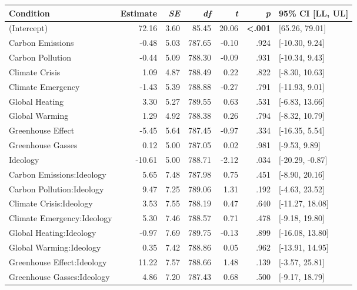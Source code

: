 \begin{table}[ht]
\centering
\begin{tabular}{lrrrrrl}
  \hline
Condition & Estimate & \textit{SE} & \textit{df} & \textit{t} & \textit{p} & 95\% CI [LL, UL] \\ 
  \hline
(Intercept) & 72.16 & 3.60 & 85.45 & 20.06 & \textbf{\textless  .001} & [65.26, 79.01] \\ 
  Carbon Emissions & -0.48 & 5.03 & 787.65 & -0.10 & .924 & [-10.30, 9.24] \\ 
  Carbon Pollution & -0.44 & 5.09 & 788.30 & -0.09 & .931 & [-10.34, 9.43] \\ 
  Climate Crisis & 1.09 & 4.87 & 788.49 & 0.22 & .822 & [-8.30, 10.63] \\ 
  Climate Emergency & -1.43 & 5.39 & 788.88 & -0.27 & .791 & [-11.93, 9.01] \\ 
  Global Heating & 3.30 & 5.27 & 789.55 & 0.63 & .531 & [-6.83, 13.66] \\ 
  Global Warming & 1.29 & 4.92 & 788.38 & 0.26 & .794 & [-8.32, 10.79] \\ 
  Greenhouse Effect & -5.45 & 5.64 & 787.45 & -0.97 & .334 & [-16.35, 5.54] \\ 
  Greenhouse Gasses & 0.12 & 5.00 & 787.05 & 0.02 & .981 & [-9.53, 9.89] \\ 
  Ideology & -10.61 & 5.00 & 788.71 & -2.12 & .034 & [-20.29, -0.87] \\ 
  Carbon Emissions:Ideology & 5.65 & 7.48 & 787.98 & 0.75 & .451 & [-8.90, 20.16] \\ 
  Carbon Pollution:Ideology & 9.47 & 7.25 & 789.06 & 1.31 & .192 & [-4.63, 23.52] \\ 
  Climate Crisis:Ideology & 3.53 & 7.55 & 788.19 & 0.47 & .640 & [-11.27, 18.08] \\ 
  Climate Emergency:Ideology & 5.30 & 7.46 & 788.57 & 0.71 & .478 & [-9.18, 19.80] \\ 
  Global Heating:Ideology & -0.97 & 7.69 & 789.75 & -0.13 & .899 & [-16.08, 13.80] \\ 
  Global Warming:Ideology & 0.35 & 7.42 & 788.86 & 0.05 & .962 & [-13.91, 14.95] \\ 
  Greenhouse Effect:Ideology & 11.22 & 7.57 & 788.66 & 1.48 & .139 & [-3.57, 25.81] \\ 
  Greenhouse Gasses:Ideology & 4.86 & 7.20 & 787.43 & 0.68 & .500 & [-9.17, 18.79] \\ 
   \hline
\end{tabular}
\end{table}
